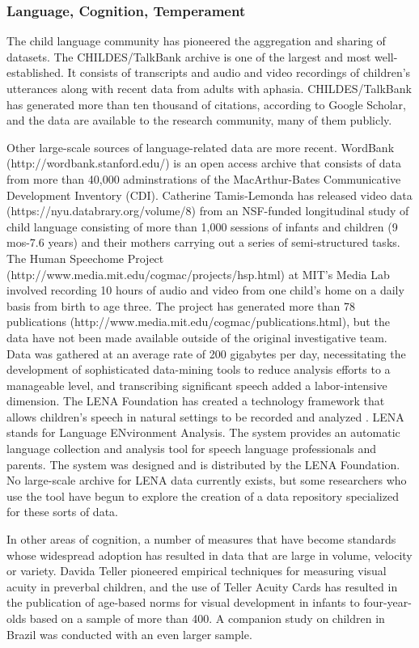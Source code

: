 \documentclass[letterpaper,man,apacite]{apa6}
\begin{document}
\subsubsection{Language, Cognition, Temperament}

The child language community has pioneered the aggregation and sharing of datasets.
The CHILDES/TalkBank \cite{macwhinney_childes_2001} archive is one of the largest and most well-established.
It consists of transcripts and audio and video recordings of children's utterances along with recent data from adults with aphasia.
CHILDES/TalkBank has generated more than ten thousand of citations, according to Google Scholar, and the data are available to the research community, many of them publicly.

Other large-scale sources of language-related data are more recent.
WordBank (http://wordbank.stanford.edu/) is an open access archive that consists of data from more than 40,000 adminstrations of the MacArthur-Bates Communicative Development Inventory (CDI).
Catherine Tamis-Lemonda has released video data (https://nyu.databrary.org/volume/8) from an NSF-funded longitudinal study of child language consisting of more than 1,000 sessions of infants and children (9 mos-7.6 years) and their mothers carrying out a series of semi-structured tasks.
The Human Speechome Project (http://www.media.mit.edu/cogmac/projects/hsp.html) at MIT's Media Lab involved recording 10 hours of audio and video from one child's home on a daily basis from birth to age three.
The project has generated more than 78 publications (http://www.media.mit.edu/cogmac/publications.html), but the data have not been made available outside of the original investigative team.
Data was gathered at an average rate of 200 gigabytes per day, necessitating the development of sophisticated data-mining tools to reduce analysis efforts to a manageable level, and transcribing significant speech added a labor-intensive dimension.
The LENA Foundation has created a technology framework that allows children's speech in natural settings to be recorded and analyzed \cite{LENA}.
LENA stands for Language ENvironment Analysis.
The system provides an automatic language collection and analysis tool for speech language professionals and parents.
The system was designed and is distributed by the LENA Foundation.
No large-scale archive for LENA data currently exists, but some researchers who use the tool have begun to explore the creation of a data repository specialized for these sorts of data.

In other areas of cognition, a number of measures that have become standards whose widespread adoption has resulted in data that are large in volume, velocity or variety.
Davida Teller pioneered empirical techniques for measuring visual acuity in preverbal children, and the use of Teller Acuity Cards has resulted in the publication of age-based norms for visual development in infants to four-year-olds \cite{mayer_monocular_1995} based on a sample of more than 400.
A companion study on children in Brazil \cite{salomao_large_1995} was conducted with an even larger sample.
\end{document}

